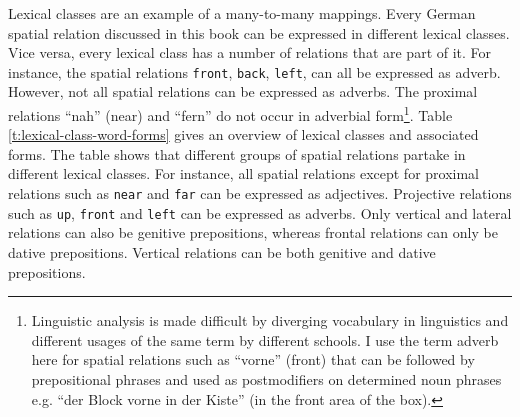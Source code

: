 Lexical classes are an example of a many-to-many mappings. 
Every German spatial relation discussed in this book
can be expressed in different lexical classes.
Vice versa, every lexical class has a number of relations that 
are part of it. For instance, the spatial relations {\footnotesize\tt front}, {\footnotesize\tt back}, 
{\footnotesize\tt left}, can all be expressed as adverb. 
However, not all spatial relations can
be expressed as adverbs. The proximal relations ``nah'' (near) and ``fern'' 
do not occur in adverbial form\footnote{Linguistic analysis is made 
difficult by diverging vocabulary in linguistics and different usages of 
the same term by different schools. I use the term adverb here for spatial relations
such as ``vorne'' (front) that can be followed by prepositional phrases and
used as postmodifiers on determined noun phrases e.g. 
``der Block vorne in der Kiste'' (in the front area of the box).}.
Table \ref{t:lexical-class-word-forms} gives an overview of lexical
classes and associated forms. The table shows that different
groups of spatial relations partake in different lexical classes. 
For instance, all spatial relations except for proximal relations 
such as {\footnotesize\tt near} and {\footnotesize\tt far} can be expressed as
adjectives. Projective relations such as {\footnotesize\tt up}, {\footnotesize\tt front}
and {\footnotesize\tt left} can be expressed as adverbs. Only
vertical and lateral relations can also be genitive prepositions, whereas
frontal relations can only be dative prepositions. Vertical relations can be both 
genitive and dative prepositions. 

